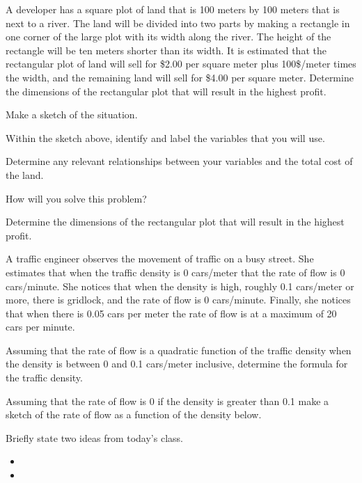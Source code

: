 \begin{problem}
\item A developer has a square plot of land that is 100 meters by 100
  meters that is next to a river. The land will be divided into two
  parts by making a rectangle in one corner of the large plot with its
  width along the river. The height of the rectangle will be ten
  meters shorter than its width. It is estimated that the rectangular
  plot of land will sell for \$2.00 per square meter plus 100\$/meter
  times the width, and the remaining land will sell for \$4.00 per
  square meter.  Determine the dimensions of the rectangular plot that
  will result in the highest profit.
  \begin{subproblem}
    \item Make a sketch of the situation.
      \vfill
    \item Within the sketch above, identify and label the variables
      that you will use.
    \item Determine any relevant relationships between your variables
      and the total cost of the land.
    \item How will you solve this problem?
      \vfill
    \item Determine the dimensions of the rectangular plot that will
      result in the highest profit.
      \vfill
      \vfill
  \end{subproblem}
  \clearpage
\item A traffic engineer observes the movement of traffic on a busy
  street. She estimates that when the traffic density is 0 cars/meter
  that the rate of flow is 0 cars/minute. She notices that when the
  density is high, roughly 0.1 cars/meter or more, there is gridlock,
  and the rate of flow is 0 cars/minute. Finally, she notices that
  when there is 0.05 cars per meter the rate of flow is at a maximum
  of 20 cars per minute.
  \begin{subproblem}
  \item Assuming that the rate of flow is a quadratic function of the
    traffic density when the density is between 0 and 0.1 cars/meter
    inclusive, determine the formula for the traffic density.
    \vfill
  \item Assuming that the rate of flow is 0 if the density is greater
    than 0.1 make a sketch of the rate of flow as a function of the
    density below.
    \vfill
  \end{subproblem}
\end{problem}

\postClass

\begin{problem}
\item Briefly state two ideas from today's class.
  \begin{itemize}
  \item 
  \item 
  \end{itemize}
\item 
  \begin{subproblem}
    \item
  \end{subproblem}
\end{problem}



